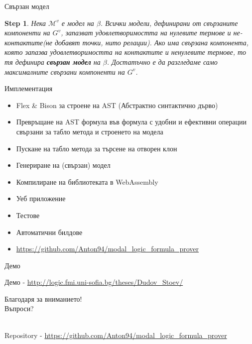 \documentclass[14pt, aspectratio=169]{beamer}
\newtheorem{step}[theorem]{Step}
\newcommand\M{\mathcal{M}}
\begin{document}
\begin{frame}{Свързан модел}
	\begin{step}
		Нека $\M^v$ е модел на $\beta$. Всички модели, дефинирани от свързаните компоненти на $G^v$, запазват удовлетворимостта на нулевите термове и не-контактите(не добавят точки, нито релации). Ако има свързана компонента, която запазва удовлетворимостта на контактите и ненулевите термове, то тя дефинира \textbf{свързан модел} на $\beta$. Достатъчно е да разгледаме само максималните свързани компоненти на $G^v$.
	\end{step}
\end{frame}

\begin{frame}{Имплементация}
	\begin{itemize}
		\item Flex \& Bison за строене на AST (Абстрактно синтактично дърво)
		\item Превръщане на AST формула във формула с удобни и ефективни операции свързани за табло метода и строенето на модела
		\item Пускане на табло метода за търсене на отворен клон
		\item Генериране на (свързан) модел
		\item Компилиране на библиотеката в WebAssembly
		\item Уеб приложение
		\item Тестове
		\item Автоматични билдове
		\item \url{https://github.com/Anton94/modal_logic_formula_prover}
	\end{itemize}
\end{frame}

\begin{frame}{Демо}
	\begin{center}
		Демо - \url{http://logic.fmi.uni-sofia.bg/theses/Dudov_Stoev/}
	\end{center}
\end{frame}

\begin{frame}
	\begin{center}
		\Huge
		Благодаря за вниманието!
		\\ [12mm]
		Въпроси?
	\end{center}

    \mbox{}
    \\ [20mm]
	\small
	Repository - \url{https://github.com/Anton94/modal_logic_formula_prover}
\end{frame}
\end{document}
